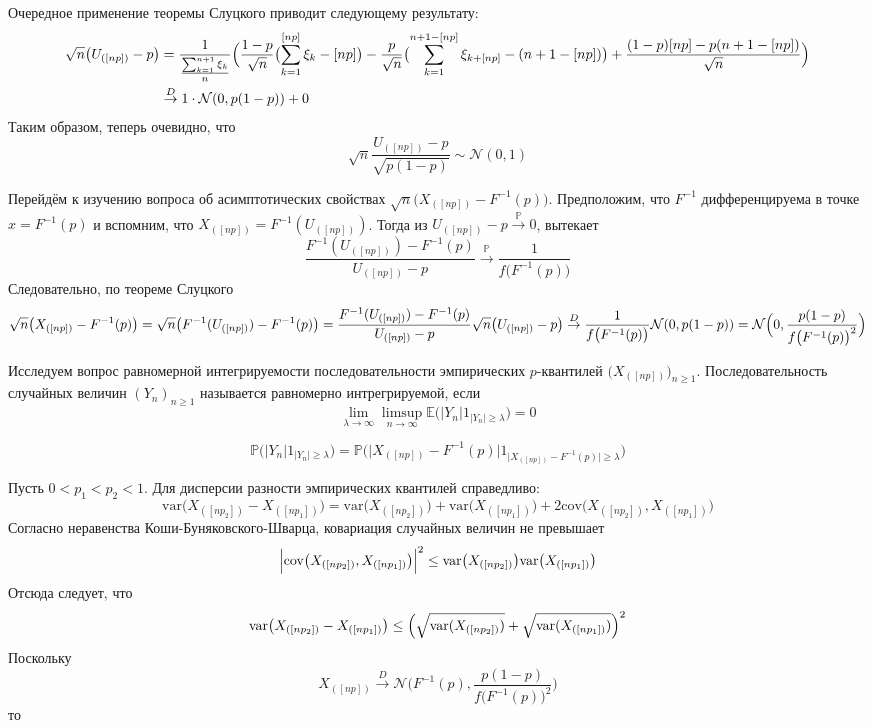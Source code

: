 \documentclass[a4paper]{article}
\newcommand{\Ncal}{\mathcal{N}}
\newcommand{\ex}[0]{{\mathbb{E}}}
\newcommand{\pr}[0]{{\mathbb{P}}}
\newcommand{\var}[0]{\text{var}}
\begin{document}
Очередное применение теоремы Слуцкого приводит следующему результату:
\begin{align*}
	\sqrt{n} \bigl( U_{([np])} - p \bigr)
	&= \frac{1}{\frac{\sum_{k=1}^{n+1} \xi_k}{n}}
		\Bigl( \frac{1-p}{\sqrt{n}}\bigl(\sum_{k=1}^{[np]} \xi_k - [np]\bigr)
			- \frac{p}{\sqrt{n}}\bigl(\sum_{k=1}^{n+1-[np]} \xi_{k+[np]} - (n+1-[np])\bigr)
			+ \frac{(1-p)[np] - p(n+1-[np])}{\sqrt{n}} \Bigr) \\
	& \overset{D}{\to} 1 \cdot \Ncal(0, p(1-p)) + 0
\end{align*}
Таким образом, теперь очевидно, что
\[\sqrt{n} \frac{U_{([np])} - p}{\sqrt{p(1-p)}} \sim \Ncal(0, 1)\]

Перейдём к изучению вопроса об асимптотических свойствах $\sqrt{n}\bigl(X_{([np])} - F^{-1}(p)\bigr)$.
Предположим, что $F^{-1}$ дифференцируема в точке $x = F^{-1}(p)$ и вспомним, что
$X_{([np])} = F^{-1}(U_{([np])})$. Тогда из $U_{([np])} - p \overset{\pr}{\to} 0$,
вытекает
\[
\frac{F^{-1}(U_{([np])}) - F^{-1}(p)}{U_{([np])} - p}
\overset{\pr}{\to}
\frac{1}{f\bigl(F^{-1}(p)\bigr)}
\]
Следовательно, по теореме Слуцкого
\[
\sqrt{n} \bigl(X_{([np])} - F^{-1}(p)\bigr)
= \sqrt{n} \bigl(F^{-1}(U_{([np])}) - F^{-1}(p)\bigr)
= \frac{F^{-1}(U_{([np])}) - F^{-1}(p)}{U_{([np])} - p}
	\sqrt{n} \bigl(U_{([np])} - p\bigr)
\overset{D}{\to} \frac{1}{f\bigl(F^{-1}(p)\bigr)} \Ncal(0, p(1-p))
= \Ncal\Bigl(0, \frac{p(1-p)}{f\bigl(F^{-1}(p)\bigr)^2} \Bigr)
\]

Исследуем вопрос равномерной интегрируемости последовательности эмпирических
$p$-квантилей $\bigl(X_{([np])}\bigr)_{n\geq1}$.
Последовательность случайных величин $(Y_n)_{n\geq1}$ называется равномерно
интрегрируемой, если
\[
\lim_{\lambda \to \infty}
	\limsup_{n\to \infty}
		\ex\bigl(\lvert Y_n \rvert 1_{\lvert Y_n \rvert \geq \lambda}\bigr)
= 0
\]

\[
\pr\bigl(\lvert Y_n \rvert 1_{\lvert Y_n \rvert \geq \lambda}\bigr)
= \pr\bigl(\lvert X_{([np])} - F^{-1}(p) \rvert
	1_{\lvert X_{([np])} - F^{-1}(p) \rvert \geq \lambda}\bigr)
\]



Пусть $0<p_1<p_2<1$. Для дисперсии разности эмпирических квантилей справедливо:
\[
\var\bigl(X_{([np_2])}-X_{([np_1])}\bigr)
= \var\bigl(X_{([np_2])}\bigr) +\var\bigl(X_{([np_1])}\bigr)
	+2 \text{cov}\bigl(X_{([np_2])},X_{([np_1])}\bigr)
\]
Согласно неравенства Коши-Буняковского-Шварца, ковариация случайных величин не превышает
\[
\Bigl\lvert \text{cov}\bigl(X_{([np_2])},X_{([np_1])}\bigr)\Bigr\rvert^2
\leq \var\bigl(X_{([np_2])}\bigr)\var\bigl(X_{([np_1])}\bigr)
\]
Отсюда следует, что
\[
\var\bigl(X_{([np_2])}-X_{([np_1])}\bigr)
\leq \Bigl( \sqrt{\var(X_{([np_2])})} + \sqrt{\var(X_{([np_1])})} \Bigr)^2
\]
Поскольку
\[
X_{([np])}
\overset{D}{\to}
\Ncal\bigl(F^{-1}(p),\frac{p(1-p)}{f\bigl(F^{-1}(p)\bigr)^2}\bigr)
\]
то
\end{document}
